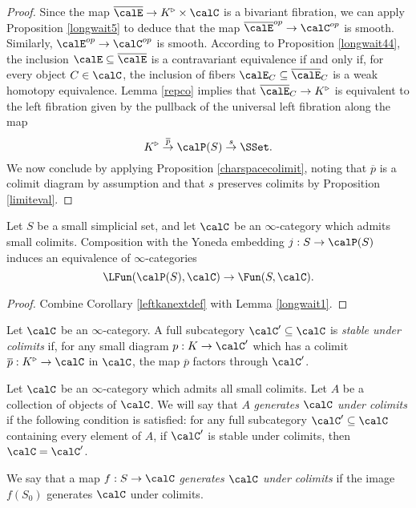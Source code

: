 \begin{proof}
Since the map $\overline{\calE} \rightarrow K^{\triangleright} \times \calC$ is a bivariant fibration, 
we can apply Proposition \ref{longwait5} to deduce that the map
$\overline{\calE}^{op} \rightarrow \calC^{op}$ is smooth. Similarly, $\calE^{op} \rightarrow \calC^{op}$ is smooth. According to Proposition \ref{longwait44}, the inclusion
$\calE \subseteq \overline{\calE}$ is a contravariant equivalence if and only if, for every
object $C \in \calC$, the inclusion of fibers $\calE_{C} \subseteq \overline{\calE}_{C}$ 
is a weak homotopy equivalence. Lemma \ref{repco} implies that
$\overline{\calE}_{C} \rightarrow K^{\triangleright}$
is equivalent to the left fibration given by the pullback of the universal left fibration
along the map
$$ K^{\triangleright} \stackrel{\overline{p}}{\rightarrow} \calP(S) \stackrel{s}{\rightarrow} \SSet.$$
We now conclude by applying Proposition \ref{charspacecolimit}, noting that
$\overline{p}$ is a colimit diagram by assumption and that $s$ preserves colimits by
Proposition \ref{limiteval}.
\end{proof}

\begin{theorem}\label{charpresheaf}
Let $S$ be a small simplicial set, and let $\calC$ be an $\infty$-category which admits small colimits. Composition with the Yoneda embedding $j: S \rightarrow \calP(S)$ induces
an equivalence of $\infty$-categories
$$ \LFun( \calP(S), \calC) \rightarrow \Fun(S,\calC).$$
\end{theorem}

\begin{proof}
Combine Corollary \ref{leftkanextdef} with Lemma \ref{longwait1}.
\end{proof}

\begin{definition}
Let $\calC$ be an $\infty$-category. A full subcategory $\calC' \subseteq \calC$ is {\it stable under colimits} if, for any small diagram $p: K \rightarrow \calC'$ which has a colimit
$\overline{p}: K^{\triangleright} \rightarrow \calC$ in $\calC$, the map $\overline{p}$ factors through $\calC'$.

Let $\calC$ be an $\infty$-category which admits all small colimits. Let $A$ be a collection of objects of $\calC$. We will say that $A$ {\it generates $\calC$ under colimits} if the following condition is satisfied: for any full subcategory $\calC' \subseteq \calC$ containing every element of $A$, if $\calC'$ is stable under colimits, then $\calC = \calC'$. 

We say that a map $f: S \rightarrow \calC$ {\it generates $\calC$ under colimits} if the image
$f(S_0)$ generates $\calC$ under colimits.
\end{definition}

